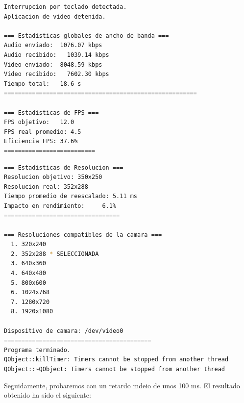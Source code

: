 \begin{adjustbox}{max width=\textwidth}
\begin{lstlisting}[language=bash,basicstyle=\ttfamily\scriptsize]
Interrupcion por teclado detectada.
Aplicacion de video detenida.

=== Estadisticas globales de ancho de banda ===
Audio enviado:	1076.07 kbps
Audio recibido:   1039.14 kbps
Video enviado:	8048.59 kbps
Video recibido:   7602.30 kbps
Tiempo total: 	18.6 s
=======================================================

=== Estadisticas de FPS ===
FPS objetivo: 	12.0
FPS real promedio: 4.5
Eficiencia FPS:	37.6%
==========================
\end{lstlisting}
\end{adjustbox}

\begin{adjustbox}{max width=\textwidth}
\begin{lstlisting}[language=bash,basicstyle=\ttfamily\scriptsize]
=== Estadisticas de Resolucion ===
Resolucion objetivo: 350x250
Resolucion real: 352x288
Tiempo promedio de reescalado: 5.11 ms
Impacto en rendimiento:    	6.1%
=================================

=== Resoluciones compatibles de la camara ===
  1. 320x240
  2. 352x288 * SELECCIONADA
  3. 640x360
  4. 640x480
  5. 800x600
  6. 1024x768
  7. 1280x720
  8. 1920x1080

Dispositivo de camara: /dev/video0
==========================================
Programa terminado.
QObject::killTimer: Timers cannot be stopped from another thread
QObject::~QObject: Timers cannot be stopped from another thread
\end{lstlisting}
\end{adjustbox}
\vspace{\baselineskip}

\newpage

Seguidamente, probaremos con un retardo mdeio de unos 100 ms. El resultado obtenido ha sido el siguiente:
\vspace{\baselineskip}

